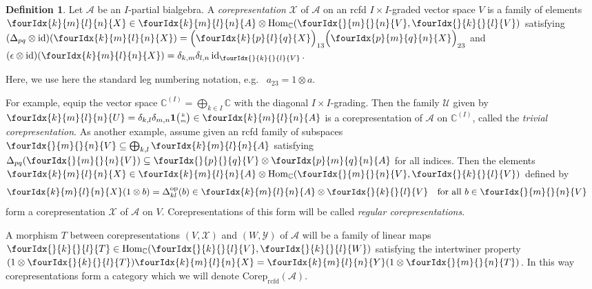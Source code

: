 \documentclass[10pt]{article}
\DeclareMathOperator{\id}{id}
\DeclareMathOperator{\Hom}{Hom}
\DeclareMathOperator{\op}{\mathrm{op}}
\DeclareMathOperator{\rcf}{\mathrm{rcfd}}
\newcommand{\Corep}{\mathrm{Corep}}
\newcommand{\C}{\mathbb{C}}
\newcommand{\Grt}[3]{#1{\tiny {\begin{pmatrix} #2\\#3\end{pmatrix}}}}
\newcommand{\UnitC}[2]{\Grt{\mathbf{1}}{#1}{#2}}
\newcommand{\Gr}[5]{\fourIdx{#2}{#4}{#3}{#5}{#1}}%
\newcommand{\Gru}[3]{\Gr{#1}{}{}{#2}{#3}}
\theoremstyle{definition}
\newtheorem{Def}[Theorem]{Definition}
\numberwithin{equation}{section}
\begin{document}
\begin{Def} \label{definition:corep} Let $\mathscr{A}$ be an
  $I$-partial bialgebra. A \emph{corepresentation}
  $\mathscr{X}$ of $\mathscr{A}$ on an rcfd $I\times I$-graded vector space $V$
  is a family of elements $\Gr{X}{k}{l}{m}{n} \in \Gr{A}{k}{l}{m}{n} \otimes
  \Hom_\C(\Gru{V}{m}{n},\Gru{V}{k}{l})$
 satisfying $ (\Delta_{pq} \otimes
    \id)(\Gr{X}{k}{l}{m}{n}) =
    \Big{(}\Gr{X}{k}{l}{p}{q}\Big{)}_{13}\Big{(}\Gr{X}{p}{q}{m}{n}\Big{)}_{23}$ and
     $(\epsilon \otimes
  \id)(\Gr{X}{k}{l}{m}{n})=\delta_{k,m}\delta_{l,n}\id_{\Gru{V}{k}{l}}$.
\end{Def}
Here, we use here the standard leg numbering notation, e.g.~ $a_{23}=1\otimes a$. 

 For example, equip the vector space
  $\C^{(I)}=\bigoplus_{k\in I} \C$ with the diagonal
  $I\times I$-grading. Then the family $\mathscr{U}$ given by $\Gr{U}{k}{l}{m}{n} = \delta_{k,l}\delta_{m,n} \UnitC{k}{m} \in
    \Gr{A}{k}{l}{m}{n}$
is a corepresentation of $\mathscr{A}$ on $\C^{(I)}$, called the
\emph{trivial corepresentation}. As another example,  assume  given an rcfd family of subspaces
  $\Gru{V}{m}{n} \subseteq \bigoplus_{k,l} \Gr{A}{k}{l}{m}{n}$ satisfying
  $\Delta_{pq}(\Gru{V}{m}{n}) \subseteq \Gru{V}{p}{q} \otimes
    \Gr{A}{p}{q}{m}{n}$ for all indices.
Then the  elements $\Gr{X}{k}{l}{m}{n} \in \Gr{A}{k}{l}{m}{n} \otimes
  \Hom_{\C}(\Gru{V}{m}{n},\Gru{V}{k}{l})$ defined by 
  \begin{align*}
    \Gr{X}{k}{l}{m}{n}(1 \otimes b) &= \Delta^{\op}_{kl}(b) \in
    \Gr{A}{k}{l}{m}{n} \otimes \Gru{V}{k}{l} \quad
    \text{for all } b\in \Gru{V}{m}{n}
  \end{align*}
  form a corepresentation $\mathscr{X}$ of $\mathscr{A}$ on
  $V$. Corepresentations of this form will be called
  \emph{regular corepresentations}. 

 A morphism  $T$ between corepresentations
  $(V,\mathscr{X})$ and $(W,\mathscr{Y})$ of $\mathscr{A}$ will be a family
  of linear maps $\Gru{T}{k}{l} \in
  \Hom_\C(\Gru{V}{k}{l},\Gru{W}{k}{l})$ satisfying the intertwiner property $(1 \otimes
  \Gru{T}{k}{l})\Gr{X}{k}{l}{m}{n} = \Gr{Y}{k}{l}{m}{n}(1 \otimes
  \Gru{T}{m}{n})$.  In this way corepresentations form a category which we will denote
$\Corep_{\rcf}(\mathscr{A})$.
\end{document}
